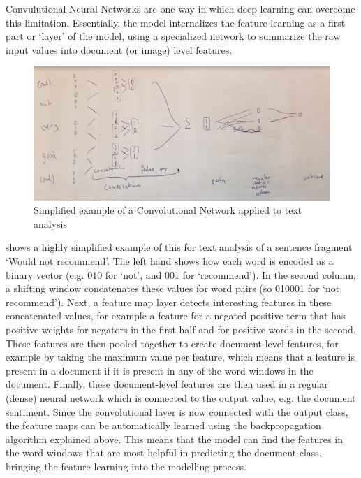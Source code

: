 Convulutional Neural Networks are one way in which deep learning can overcome this limitation.
Essentially, the model internalizes the feature learning as a first part or `layer' of the model,
using a specialized network to summarize the raw input values into document (or image) level features. 

\begin{figure}
  \includegraphics[width=\linewidth]{figures/ch09_cnn.png}
  \caption{Simplified example of a Convolutional Network applied to text analysis}
  \label{fig:cnn}
  \end{figure}

 shows a highly simplified example of this for text analysis of a sentence fragment `Would not recommend'.
The left hand shows how each word is encoded as a binary vector (e.g. 010 for `not', and 001 for `recommend').
In the second column, a shifting window concatenates these values for word pairs (so 010001 for `not recommend').
Next, a feature map layer detects interesting features in these concatenated values, for example
a feature for a negated positive term that has positive weights for negators in the first half and for positive words in the second.
These features are then pooled together to create document-level features,
for example by taking the maximum value per feature, which means that a feature is present in a document if it is present in any of the word windows in the document.
Finally, these document-level features are then used in a regular (dense) neural network which is connected to the output value, e.g. the document sentiment.
Since the convolutional layer is now connected with the output class, the feature maps can be automatically learned using the backpropagation algorithm explained above.
This means that the model can find the features in the word windows that are most helpful in predicting the document class, bringing the feature learning into the modelling process.

